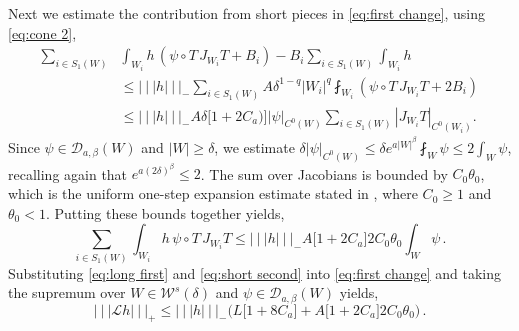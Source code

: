\documentclass{amsart}
\numberwithin{equation}{section}
\newcommand\cD{{\mathcal D}}
\newcommand\cL{{\mathcal L}}
\newcommand\cW{{\mathcal W}}
\newcommand{\tri}{{|\:\!\!|\:\!\!|}}
\begin{document}
Next we estimate the contribution from short pieces in \eqref{eq:first change}, using \eqref{eq:cone 2},
\begin{equation}
\label{eq:short first}
\begin{split}
\sum_{i \in S_1(W)} & \int_{W_i} h \, (\psi \circ T \, J_{W_i}T  + B_i) - B_i \sum_{i \in S_1(W)} \int_{W_i} h 
\\
& \le \tri h \tri_- \sum_{i \in S_1(W)} A \delta^{1-q} |W_i|^q \fint_{W_i}  (\psi \circ T \, J_{W_i} T + 2B_i) \\
& \le \tri h \tri_- A \delta \big[ 1+2 C_a) \big] |\psi|_{C^0(W)} \sum_{i \in S_1(W)}  |J_{W_i}T|_{C^0(W_i)} . 
\end{split}
\end{equation}
Since $\psi \in \cD_{a, \beta}(W)$ and $|W| \ge \delta$, we estimate
$\delta |\psi|_{C^0(W)} \le \delta e^{a|W|^\beta} \fint_W \psi \le 2 \int_W \psi$, recalling again
that $e^{a(2\delta)^\beta} \le 2$.  
The sum over Jacobians is bounded by $C_0 \theta_0$, which is the uniform
one-step expansion estimate stated in \cite[eq. (3.4)]{DL22}, where $C_0 \ge 1$ and $\theta_0 < 1$.
Putting these bounds together yields,
\begin{equation}
\label{eq:short second}
\sum_{i \in S_1(W)} \int_{W_i} h \, \psi \circ T \, J_{W_i}T \le 
\tri h \tri_-  A \big[ 1+2 C_a \big] 2 C_0 \theta_0 \int_W \psi \, .
\end{equation}
Substituting \eqref{eq:long first} and \eqref{eq:short second} into \eqref{eq:first change}
and taking the supremum over $W \in \cW^s(\delta)$ and $\psi \in \cD_{a, \beta}(W)$ yields,
\begin{equation}
\label{eq:upper tri}
\tri \cL h \tri_+ \le \tri h \tri_- \Big( L \big[ 1 + 8 C_a \big]
+ A \big[ 1+2 C_a\big] 2 C_0 \theta_0 \Big) \, .
\end{equation}
\end{document}
